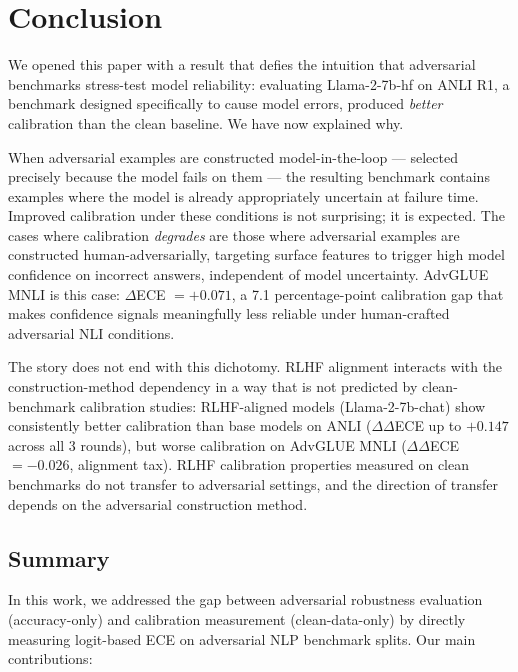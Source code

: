 \section{Conclusion}
\label{sec:conclusion}

We opened this paper with a result that defies the intuition that adversarial benchmarks stress-test model reliability: evaluating Llama-2-7b-hf on ANLI R1, a benchmark designed specifically to cause model errors, produced \textit{better} calibration than the clean baseline. We have now explained why.

When adversarial examples are constructed model-in-the-loop --- selected precisely because the model fails on them --- the resulting benchmark contains examples where the model is already appropriately uncertain at failure time. Improved calibration under these conditions is not surprising; it is expected. The cases where calibration \textit{degrades} are those where adversarial examples are constructed human-adversarially, targeting surface features to trigger high model confidence on incorrect answers, independent of model uncertainty. AdvGLUE MNLI is this case: $\Delta$ECE $= +0.071$, a 7.1 percentage-point calibration gap that makes confidence signals meaningfully less reliable under human-crafted adversarial NLI conditions.

The story does not end with this dichotomy. RLHF alignment interacts with the construction-method dependency in a way that is not predicted by clean-benchmark calibration studies: RLHF-aligned models (Llama-2-7b-chat) show consistently better calibration than base models on ANLI ($\Delta\Delta$ECE up to $+0.147$ across all 3 rounds), but worse calibration on AdvGLUE MNLI ($\Delta\Delta$ECE $= -0.026$, alignment tax). RLHF calibration properties measured on clean benchmarks do not transfer to adversarial settings, and the direction of transfer depends on the adversarial construction method.

\subsection*{Summary}

In this work, we addressed the gap between adversarial robustness evaluation (accuracy-only) and calibration measurement (clean-data-only) by directly measuring logit-based ECE on adversarial NLP benchmark splits. Our main contributions:

